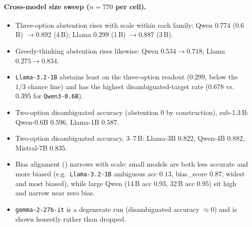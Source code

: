 \paragraph{Cross-model size sweep ($n{=}770$ per cell).}
\begin{itemize}[leftmargin=*,topsep=2pt,itemsep=1pt]
  \item Three-option abstention rises with scale within each family: Qwen $0.774$
    (0.6\,B) $\to 0.892$ (4\,B); Llama $0.299$ (1\,B) $\to 0.887$ (3\,B).
  \item Greedy-thinking abstention rises likewise: Qwen $0.534 \to 0.718$; Llama
    $0.275 \to 0.834$.
  \item \texttt{Llama-3.2-1B} abstains least on the three-option readout ($0.299$,
    below the $1/3$ chance line) and has the highest disambiguated-target rate
    ($0.678$ vs.\ $0.395$ for \texttt{Qwen3-0.6B}).
  \item Two-option disambiguated accuracy (abstention $0$ by construction),
    sub-1.3\,B: Qwen-0.6B $0.596$, Llama-1B $0.587$.
  \item Two-option disambiguated accuracy, 3--7\,B: Llama-3B $0.822$, Qwen-4B
    $0.882$, Mistral-7B $0.835$.
  \item Bias alignment () narrows with scale: small models are
    both less accurate and more biased (e.g.\ \texttt{Llama-3.2-1B} ambiguous acc
    $0.13$, bias\_score $0.87$, widest and most biased), while large Qwen
    (14\,B acc $0.93$, 32\,B acc $0.95$) sit high and narrow near zero bias.
  \item \texttt{gemma-2-27b-it} is a degenerate run (disambiguated accuracy
    $\approx0$) and is shown honestly rather than dropped.
\end{itemize}


